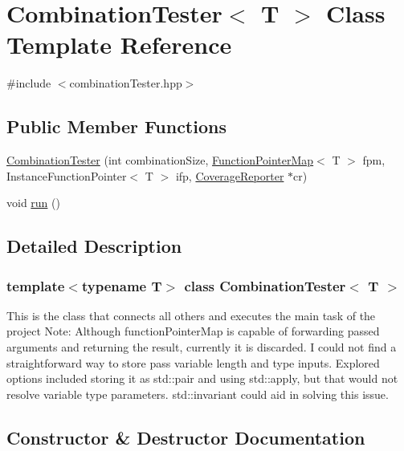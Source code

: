 \hypertarget{classCombinationTester}{}\section{Combination\+Tester$<$ T $>$ Class Template Reference}
\label{classCombinationTester}


{\ttfamily \#include $<$combination\+Tester.\+hpp$>$}

\subsection*{Public Member Functions}
\begin{DoxyCompactItemize}
\item 
\hyperlink{classCombinationTester_a9eef45cd51683748083a1148bff36f74}{Combination\+Tester} (int combination\+Size, \hyperlink{classFunctionPointerMap}{Function\+Pointer\+Map}$<$ T $>$ fpm, Instance\+Function\+Pointer$<$ T $>$ ifp, \hyperlink{classCoverageReporter}{Coverage\+Reporter} $\ast$cr)
\item 
void \hyperlink{classCombinationTester_ada3b5998973cb34e6343a971390b3a12}{run} ()
\end{DoxyCompactItemize}


\subsection{Detailed Description}
\subsubsection*{template$<$typename T$>$\newline
class Combination\+Tester$<$ T $>$}

This is the class that connects all others and executes the main task of the project Note\+: Although function\+Pointer\+Map is capable of forwarding passed arguments and returning the result, currently it is discarded. I could not find a straightforward way to store pass variable length and type inputs. Explored options included storing it as std\+::pair and using std\+::apply, but that would not resolve variable type parameters. std\+::invariant could aid in solving this issue. 

\subsection{Constructor \& Destructor Documentation}
\mbox{\label{classCombinationTester_a9eef45cd51683748083a1148bff36f74}} 
